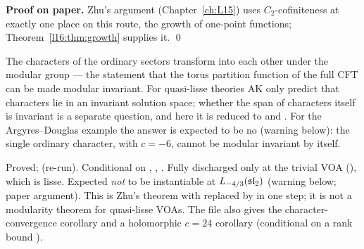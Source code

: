 \textbf{Proof on paper.} Zhu's argument (Chapter~\ref{ch:L15}) uses $C_2$-cofiniteness at exactly one place on this route,
the growth of one-point functions; Theorem~\ref{l16:thm:growth} supplies it. \qed

\begin{physics}
The characters of the ordinary sectors transform into each other under the modular group --- the statement that the torus
partition function of the full CFT can be made modular invariant. For quasi-lisse theories AK only predict that characters
lie in an invariant solution space; whether the span of characters itself is invariant is a separate question, and here it is
reduced to  and . For the Argyres--Douglas example the answer is expected to be no (warning below):
the single ordinary character, with $c=-6$, cannot be modular invariant by itself.
\end{physics}

\begin{status}
Proved; \lean{[propext, Classical.}\allowbreak{}\allowbreak\lean{sound]} (re-run). Conditional on , , . Fully
discharged only at the trivial VOA (\allowbreak{}\allowbreak{}\allowbreak{}), which is lisse.
Expected \emph{not} to be instantiable at $L_{-4/3}(\mathfrak{sl}_2)$ (warning below; paper argument). This is Zhu's theorem with
 replaced by  in one step; it is not a modularity theorem for quasi-lisse VOAs. The file also gives the
character-convergence corollary \allowbreak{}\allowbreak{} and a holomorphic $c=24$ corollary
\allowbreak{}\allowbreak{}\allowbreak{} (conditional on a rank bound ).
\end{status}

